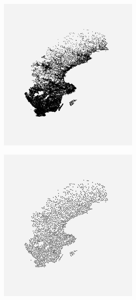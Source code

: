 \begin{figure}[H]
	\begin{subfigure}[b]{1\linewidth}
		\centering
	\begin{subfigure}[t]{0.29\linewidth}
		\centering
		\includegraphics[width=0.9\linewidth]{Pictures/sweden} 
		\caption{} 
		\label{fig:sweden2} 
		\vspace{4ex}
	\end{subfigure}%
	\begin{subfigure}[t]{0.29\linewidth}
		\centering
		\includegraphics[width=0.9\linewidth]{Pictures/bp10_1_sweden} 

\end{subfigure}
\end{subfigure}
\end{figure}

